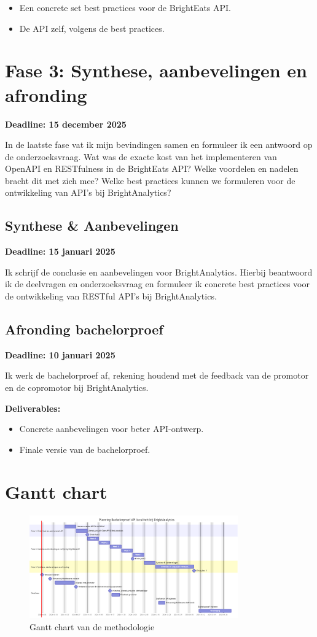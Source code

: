 \begin{itemize}
  \item Een concrete set best practices voor de BrightEats API.
  \item De API zelf, volgens de best practices.
\end{itemize}

\section{Fase 3: Synthese, aanbevelingen en afronding}

\textbf{Deadline: 15 december 2025}

\bigskip
In de laatste fase vat ik mijn bevindingen samen en formuleer ik een antwoord op de onderzoeksvraag. Wat was de exacte kost van het implementeren van OpenAPI en RESTfulness in de BrightEats API? Welke voordelen en nadelen bracht dit met zich mee? Welke best practices kunnen we formuleren voor de ontwikkeling van API's bij BrightAnalytics?

\subsection{Synthese \& Aanbevelingen}

\textbf{Deadline: 15 januari 2025}

\bigskip
Ik schrijf de conclusie en aanbevelingen voor BrightAnalytics. Hierbij beantwoord ik de deelvragen en onderzoeksvraag en formuleer ik concrete best practices voor de ontwikkeling van RESTful API's bij BrightAnalytics.

\subsection{Afronding bachelorproef}

\textbf{Deadline: 10 januari 2025}

\bigskip
Ik werk de bachelorproef af, rekening houdend met de feedback van de promotor en de copromotor bij BrightAnalytics.

\textbf{Deliverables:}

\begin{itemize}
  \item Concrete aanbevelingen voor beter API-ontwerp.
  \item Finale versie van de bachelorproef.
\end{itemize}

\section{Gantt chart}

\begin{figure}[H]
  \centering
  \includegraphics[width=0.8\textwidth]{gantt.png}
  \caption{Gantt chart van de methodologie}
  \label{fig:gantt}
\end{figure}
